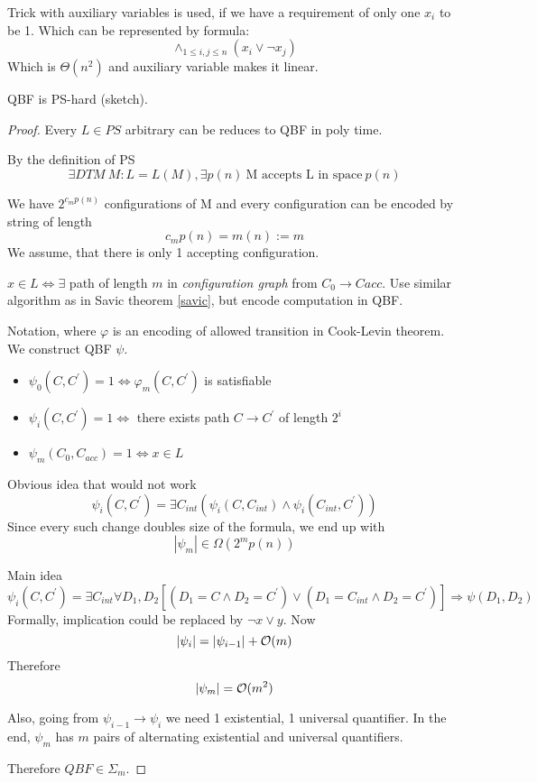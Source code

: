 \begin{note}
	Trick with auxiliary variables is used, if we have a requirement of only one $x_i$ to be 1.
	Which can be represented by formula:
	\[ \wedge_{1 \leq i,j \leq n}(x_i \lor \neg x_j) \]
	Which is $\Theta(n^2)$ and auxiliary variable makes it linear.
\end{note}

\begin{theorem}
	QBF is PS-hard (sketch).
\end{theorem}
\begin{proof}
	Every $L \in PS$ arbitrary can be reduces to QBF in poly time.

	By the definition of PS
	\[ \exists DTM\ M: L = L(M), \exists p(n)\ \text{M accepts L in space}\ p(n)\]

	We have $2^{c_m p(n)}$ configurations of M and every configuration can be encoded by string of length
	\[ c_m p(n) = m(n) := m \]
	We assume, that there is only 1 accepting configuration.

	$x \in L \iff \exists $ path of length $m$ in \emph{configuration graph} from $C_0 \to C{acc}$.
	Use similar algorithm as in Savic theorem \cref{savic}, but encode computation in QBF.

	Notation, where $\varphi$ is an encoding of allowed transition in Cook-Levin theorem.
	We construct QBF $\psi$.
	\begin{itemize}
		\item $ \psi_0(C, C^{\prime}) = 1 \iff \varphi_m(C, C^{\prime})$ is satisfiable
		\item $ \psi_i(C, C^{\prime}) = 1 \iff $ there exists path $C \to C^{\prime}$ of length $2^i$
		\item $ \psi_m(C_0, C_{acc}) = 1 \iff x \in L$
	\end{itemize}

	Obvious idea that would not work
	\[ \psi_i(C, C^{\prime}) = \exists C_{int} (\psi_i(C, C_{int}) \land \psi_i(C_{int}, C^{\prime})) \]
	Since every such change doubles size of the formula, we end up with
	\[ |\psi_m| \in \Omega(2^m p(n)) \]

	Main idea
	\[ \psi_i(C, C^{\prime}) = \exists C_{int} \forall D_1, D_2 [(D_1 = C \land D_2 = C^{\prime}) \lor (D_1 = C_{int} \land D_2 = C^{\prime})] \Rightarrow \psi(D_1, D_2) \]
	Formally, implication could be replaced by $\neg x \lor y$.
	Now
	\[ |\psi_i| = |\psi_{i - 1}| + \mathcal{O}(m) \]
	Therefore
	\[ |\psi_m| = \mathcal{O}(m^2) \]

	Also, going from $\psi_{i - 1} \to \psi_{i}$ we need 1 existential, 1 universal quantifier.
	In the end, $\psi_m$ has $m$ pairs of alternating existential and universal quantifiers.

	Therefore $QBF \in \Sigma_m$.
\end{proof}


